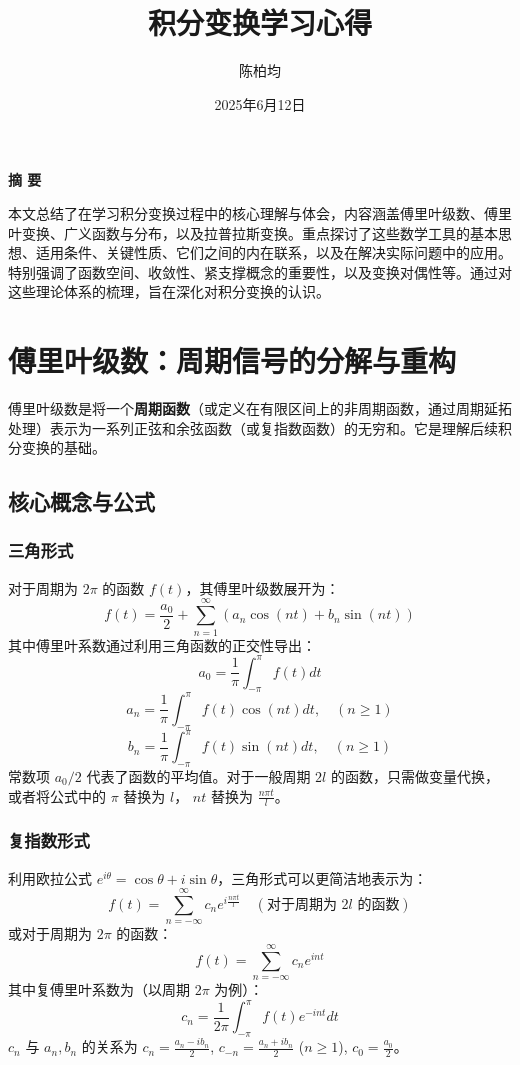 \documentclass[UTF8]{ctexart}
\title{\textbf{积分变换学习心得}}
\author{陈柏均 }
\date{2025年6月12日}
\begin{document}
	\maketitle
\centerline{\textbf{\Large 摘 \quad 要}} %
\vspace{0.5cm} %
		本文总结了在学习积分变换过程中的核心理解与体会，内容涵盖傅里叶级数、傅里叶变换、广义函数与分布，以及拉普拉斯变换。重点探讨了这些数学工具的基本思想、适用条件、关键性质、它们之间的内在联系，以及在解决实际问题中的应用。特别强调了函数空间、收敛性、紧支撑概念的重要性，以及变换对偶性等。通过对这些理论体系的梳理，旨在深化对积分变换的认识。
		
		\vspace{0.5cm} %

	
	\newpage
	
	\tableofcontents
	
	\newpage
	
	\section{傅里叶级数：周期信号的分解与重构}
	傅里叶级数是将一个\textbf{周期函数}（或定义在有限区间上的非周期函数，通过周期延拓处理）表示为一系列正弦和余弦函数（或复指数函数）的无穷和。它是理解后续积分变换的基础。
	
	\subsection{核心概念与公式}
	
	\subsubsection{三角形式}
	对于周期为 $2\pi$ 的函数 $f(t)$，其傅里叶级数展开为：
	\[ f(t) = \frac{a_0}{2} + \sum_{n=1}^{\infty} (a_n \cos(nt) + b_n \sin(nt)) \]
	其中傅里叶系数通过利用三角函数的正交性导出：
	\[ a_0 = \frac{1}{\pi} \int_{-\pi}^{\pi} f(t) dt \]
	\[ a_n = \frac{1}{\pi} \int_{-\pi}^{\pi} f(t) \cos(nt) dt, \quad (n \ge 1) \]
	\[ b_n = \frac{1}{\pi} \int_{-\pi}^{\pi} f(t) \sin(nt) dt, \quad (n \ge 1) \]
	常数项 $a_0/2$ 代表了函数的平均值。对于一般周期 $2l$ 的函数，只需做变量代换，或者将公式中的 $\pi$ 替换为 $l$， $nt$ 替换为 $\frac{n\pi t}{l}$。
	
	\subsubsection{复指数形式}
	利用欧拉公式 $e^{i\theta} = \cos\theta + i\sin\theta$，三角形式可以更简洁地表示为：
	\[ f(t) = \sum_{n=-\infty}^{\infty} c_n e^{i \frac{n\pi t}{l}} \quad (\text{对于周期为 } 2l \text{ 的函数}) \]
	或对于周期为 $2\pi$ 的函数：
	\[ f(t) = \sum_{n=-\infty}^{\infty} c_n e^{int} \]
	其中复傅里叶系数为（以周期 $2\pi$ 为例）：
	\[ c_n = \frac{1}{2\pi} \int_{-\pi}^{\pi} f(t) e^{-int} dt \]
	$c_n$ 与 $a_n, b_n$ 的关系为 $c_n = \frac{a_n - ib_n}{2}$, $c_{-n} = \frac{a_n + ib_n}{2}$ ($n \ge 1$), $c_0 = \frac{a_0}{2}$。
	
\end{document}
